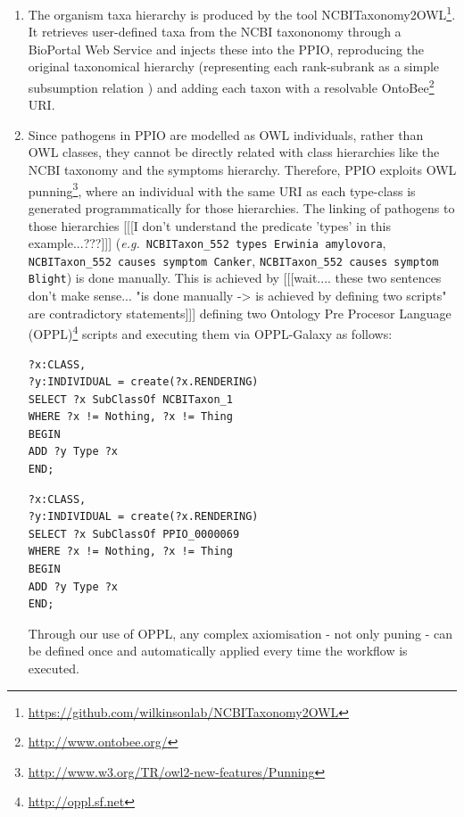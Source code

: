 \documentclass[sw]{iosart2c}
\newcommand{\myurl}[1]{\footnote{\url{#1}}}
\newcommand{\eg}{\emph{e.g.}\xspace}
\newcommand{\con}[1]{\texttt{#1}\xspace}
\begin{document}
\begin{enumerate}

\item The organism taxa hierarchy is produced by the tool NCBITaxonomy2OWL\myurl{https://github.com/wilkinsonlab/NCBITaxonomy2OWL}.  It retrieves user-defined taxa from the NCBI taxononomy through a BioPortal Web Service \cite{bioportal} and injects these into the PPIO, reproducing the original taxonomical hierarchy (representing each rank-subrank as a simple subsumption relation \cite{taxa_ismb_2008}) and adding each taxon with a resolvable OntoBee\myurl{http://www.ontobee.org/} URI.

\item Since pathogens in PPIO are modelled as OWL individuals, rather than OWL classes, they cannot be directly related with class hierarchies like the NCBI taxonomy and the symptoms hierarchy. Therefore, PPIO exploits OWL punning\myurl{http://www.w3.org/TR/owl2-new-features/Punning}, where an individual with the same URI as each type-class is generated programmatically for those hierarchies.  The linking of pathogens to those hierarchies [[[I don't understand the predicate 'types' in this example...???]]] (\eg~\con{NCBITaxon\_552 types Erwinia amylovora}, \con{NCBITaxon\_552 causes symptom Canker}, \con{NCBITaxon\_552 causes symptom Blight}) is done manually. This is achieved by [[[wait.... these two sentences don't make sense...  "is done manually -> is achieved by defining two scripts" are contradictory statements]]] defining two Ontology Pre Procesor Language (OPPL)\myurl{http://oppl.sf.net} scripts and executing them via OPPL-Galaxy \cite{OPPL-Galaxy-JBMS} as follows:

{\small 
\begin{verbatim}
?x:CLASS,
?y:INDIVIDUAL = create(?x.RENDERING)
SELECT ?x SubClassOf NCBITaxon_1
WHERE ?x != Nothing, ?x != Thing
BEGIN
ADD ?y Type ?x
END;
\end{verbatim}
}

{\small 
\begin{verbatim}
?x:CLASS,
?y:INDIVIDUAL = create(?x.RENDERING)
SELECT ?x SubClassOf PPIO_0000069
WHERE ?x != Nothing, ?x != Thing
BEGIN
ADD ?y Type ?x
END;
\end{verbatim}
}

Through our use of OPPL, any complex axiomisation - not only puning - can be defined once and automatically applied every time the workflow is executed.

\end{enumerate}
\end{document}
